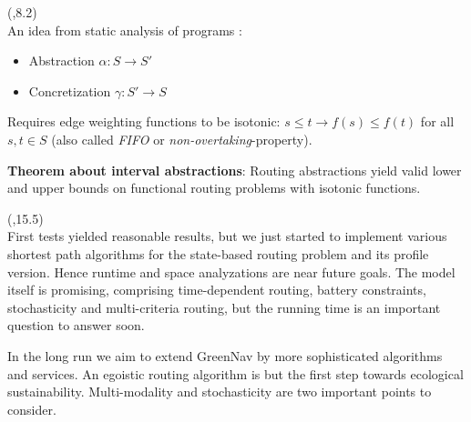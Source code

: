 \begin{textblock}{\mycolwidth}(\rightpos,8.2)
 \\
\large
An idea from static analysis of programs \cite{cousot1977}:
\begin{itemize}[itemindent=2cm,labelsep=1cm]
  \item Abstraction $\alpha: S \to S'$
  \item Concretization $\gamma: S' \to S$
\end{itemize}
\begin{center}
\end{center}
Requires edge weighting functions to be isotonic: $s \leq t \to f(s) \leq f(t)$ for all $s, t \in S$ (also called \emph{FIFO} or \emph{non-overtaking}-property).

\textbf{Theorem about interval abstractions}: Routing abstractions yield valid lower and upper bounds on functional routing problems with isotonic functions.
\end{textblock}

\begin{textblock}{\mycolwidth}(\rightpos,15.5)
 \\
\large
First tests yielded reasonable results, but we just started to implement
various shortest path algorithms for the state-based routing problem and
its profile version. Hence runtime and space analyzations are near future
goals. The model itself is promising, comprising time-dependent routing,
battery constraints, stochasticity and multi-criteria routing, but the
running time is an important question to answer soon.

In the long run we aim to extend GreenNav by more sophisticated algorithms
and services. An egoistic routing algorithm is but the first step towards
ecological sustainability. Multi-modality and stochasticity are two important
points to consider.
\end{textblock}